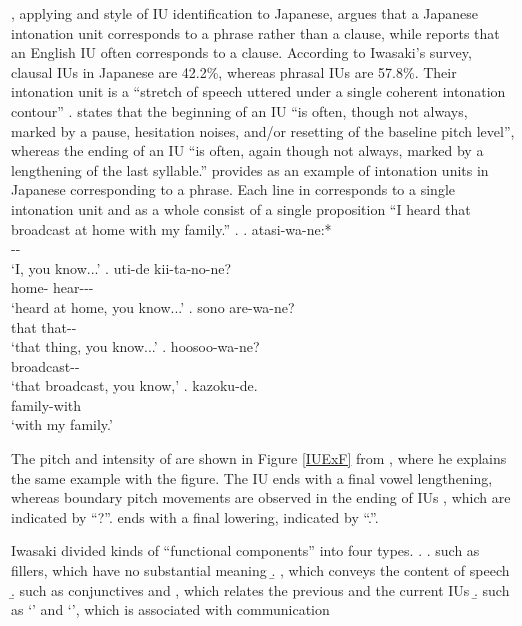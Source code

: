 ,
applying  and  style of IU identification to Japanese,
argues that a Japanese intonation unit corresponds to a phrase rather than a clause,
while  reports that an English IU often corresponds to a clause.
According to Iwasaki's survey,
clausal IUs in Japanese are 42.2\%,
whereas phrasal IUs are 57.8\%.
Their intonation unit is a ``stretch of speech uttered under a single coherent intonation contour'' \cite[17]{duboisetal92}.
 states that
the beginning of an IU ``is often, though not always, marked by a pause, hesitation noises, and/or resetting of the baseline pitch level'',
whereas the ending of an IU ``is often, again though not always, marked by a lengthening of the last syllable.''
 provides \Next as an example of intonation units in Japanese corresponding to a phrase.
Each line in \Next corresponds to a single intonation unit
and \Next[a-e] as a whole consist of a single proposition
``I heard that broadcast at home with my family.''
%
\ex.
 \ag. atasi-wa-ne:* \\
      -- \\
      `I, you know...'
 \bg. uti-de kii-ta-no-ne? \\
      home- hear--- \\
      `heard at home, you know...'
 \bg. sono are-wa-ne? \\
      that that-- \\
      `that thing, you know...'
 \bg. hoosoo-wa-ne? \\
      broadcast-- \\
      `that broadcast, you know,'
 \bg. kazoku-de. \\
      family-with \\
      `with my family.'
 \hfill{\cite[40]{iwasaki93}}

The pitch and intensity of \Next are shown in Figure \ref{IUExF} from
,
where he explains the same example with the figure.
The IU \Next[a] ends with a final vowel lengthening,
whereas boundary pitch movements are observed in the ending of IUs \Next[b-d],
which are indicated by ``?''.
\Next[e] ends with a final lowering, indicated by ``.''.

Iwasaki divided kinds of ``functional components'' into four types.
%
\ex.
 \a.  such as fillers, which have no substantial meaning
 \b. , which conveys the content of speech
 \b.  such as conjunctives and , which relates the previous and the current IUs
 \b.  such as  `' and  `', which is associated with communication

